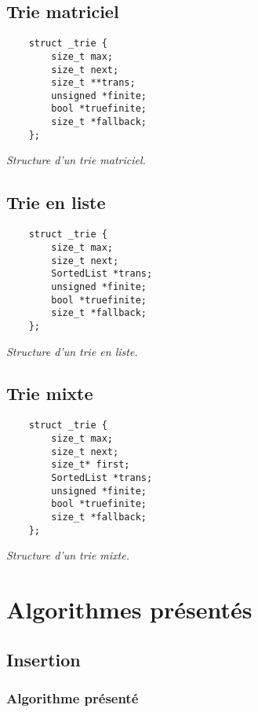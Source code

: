 \subsection{Trie matriciel}
\begin{verbatim}
    struct _trie {
        size_t max;
        size_t next;
        size_t **trans;
        unsigned *finite;
        bool *truefinite;
        size_t *fallback;
    };
\end{verbatim}
\begin{center}\textit{Structure d'un trie matriciel.}\end{center}

\newpage
\subsection{Trie en liste}
\begin{verbatim}
    struct _trie {
        size_t max;
        size_t next;
        SortedList *trans;
        unsigned *finite;
        bool *truefinite;
        size_t *fallback;
    };
\end{verbatim}
\begin{center}\textit{Structure d'un trie en liste.}\end{center}

\subsection{Trie mixte}
\begin{verbatim}
    struct _trie {
        size_t max;
        size_t next;
        size_t* first;
        SortedList *trans;
        unsigned *finite;
        bool *truefinite;
        size_t *fallback;
    };
\end{verbatim}
\begin{center}\textit{Structure d'un trie mixte.}\end{center}

\newpage
\section{Algorithmes présentés}
\subsection{Insertion}
\subsubsection*{Algorithme présenté}

